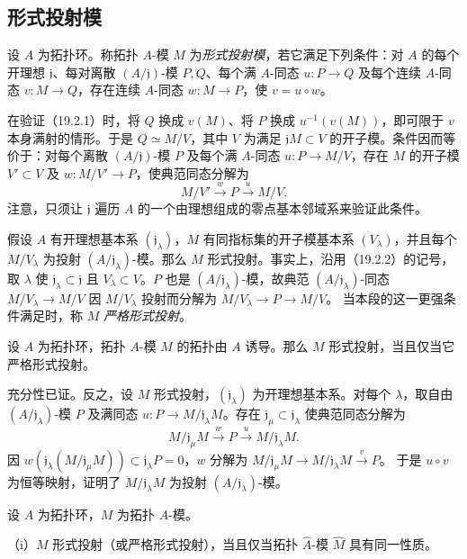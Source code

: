\subsection{形式投射模}
设 $A$ 为拓扑环。称拓扑 $A$-模 $M$ 为\emph{形式投射模}，若它满足下列条件：对 $A$ 的每个开理想 $\mathfrak j$、每对离散 $(A/\mathfrak j)$-模 $P,Q$、每个满 $A$-同态 $u:P\to Q$ 及每个连续 $A$-同态 $v:M\to Q$，存在连续 $A$-同态 $w:M\to P$，使 $v=u\circ w$。

在验证（19.2.1）时，将 $Q$ 换成 $v(M)$、将 $P$ 换成 $u^{-1}(v(M))$，即可限于 $v$ 本身满射的情形。于是 $Q\simeq M/V$，其中 $V$ 为满足 $\mathfrak jM\subset V$ 的开子模。条件因而等价于：对每个离散 $(A/\mathfrak j)$-模 $P$ 及每个满 $A$-同态 $u:P\to M/V$，存在 $M$ 的开子模 $V'\subset V$ 及 $w:M/V'\to P$，使典范同态分解为
\[
 M/V'\xrightarrow{w}P\xrightarrow{u}M/V.
\]
注意，只须让 $\mathfrak j$ 遍历 $A$ 的一个由理想组成的零点基本邻域系来验证此条件。

假设 $A$ 有开理想基本系 $(\mathfrak j_\lambda)$，$M$ 有同指标集的开子模基本系 $(V_\lambda)$，并且每个 $M/V_\lambda$ 为投射 $(A/\mathfrak j_\lambda)$-模。那么 $M$ 形式投射。事实上，沿用（19.2.2）的记号，取 $\lambda$ 使 $\mathfrak j_\lambda\subset\mathfrak j$ 且 $V_\lambda\subset V$。$P$ 也是 $(A/\mathfrak j_\lambda)$-模，故典范 $(A/\mathfrak j_\lambda)$-同态 $M/V_\lambda\to M/V$ 因 $M/V_\lambda$ 投射而分解为 $M/V_\lambda\to P\to M/V$。
当本段的这一更强条件满足时，称 $M$ \emph{严格形式投射}。

设 $A$ 为拓扑环，拓扑 $A$-模 $M$ 的拓扑由 $A$ 诱导。那么 $M$ 形式投射，当且仅当它严格形式投射。

充分性已证。反之，设 $M$ 形式投射，$(\mathfrak j_\lambda)$ 为开理想基本系。对每个 $\lambda$，取自由 $(A/\mathfrak j_\lambda)$-模 $P$ 及满同态 $u:P\to M/\mathfrak j_\lambda M$。存在 $\mathfrak j_\mu\subset\mathfrak j_\lambda$ 使典范同态分解为
\[
 M/\mathfrak j_\mu M\xrightarrow{w}P\xrightarrow{u}M/\mathfrak j_\lambda M.
\]
因 $w(\mathfrak j_\lambda(M/\mathfrak j_\mu M))\subset\mathfrak j_\lambda P=0$，$w$ 分解为
$M/\mathfrak j_\mu M\to M/\mathfrak j_\lambda M\xrightarrow{v}P$。
于是 $u\circ v$ 为恒等映射，证明了 $M/\mathfrak j_\lambda M$ 为投射 $(A/\mathfrak j_\lambda)$-模。

设 $A$ 为拓扑环，$M$ 为拓扑 $A$-模。

（i）$M$ 形式投射（或严格形式投射），当且仅当拓扑 $\widehat A$-模 $\widehat M$ 具有同一性质。

